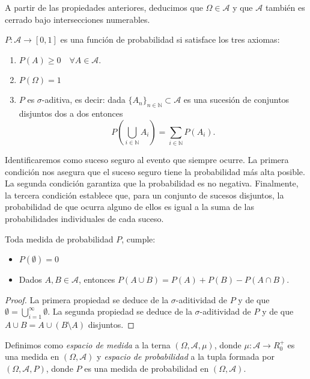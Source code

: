 \documentclass[oneside,openright,titlepage,numbers=noenddot,openany,headinclude,footinclude=true,
cleardoublepage=empty,abstractoff,BCOR=5mm,paper=a4,fontsize=12pt,main=spanish]{scrreprt}
\begin{document}
A partir de las propiedades anteriores, deducimos que $\Omega \in \mathcal{A}$ 
y que $\mathcal{A}$ también es cerrado bajo intersecciones numerables.

\begin{definition}
$P: \mathcal{A} \rightarrow [0,1]$ es una función de probabilidad si satisface los tres axiomas:
\begin{enumerate}
  \item $P(A) \geq 0 \quad \forall A \in \mathcal{A}$.
  \item $P(\Omega) = 1$
  \item $P$ es $\sigma$-aditiva, es decir: dada $\{A_n \}_{n \in \mathbb{N}} \subset \mathcal{A}$ es una sucesión de conjuntos disjuntos dos a dos entonces
    $$
    P\left( \bigcup_{i\in \mathbb{N}} A_i \right) = \sum_{i \in \mathbb{N}} P(A_i).
    $$
\end{enumerate}
\end{definition}

Identificaremos como suceso seguro al evento que siempre ocurre. La primera
condición nos asegura que el suceso seguro tiene la probabilidad más alta
posible. La segunda condición garantiza que la probabilidad es no negativa.
Finalmente, la tercera condición establece que, para un conjunto de sucesos
disjuntos, la probabilidad de que ocurra alguno de ellos es igual a la suma de
las probabilidades individuales de cada suceso.

\newpage

\begin{proposition}
Toda medida de probabilidad $P$, cumple:
  \begin{itemize}
    \item $P(\emptyset) = 0$
    \item Dados $A, B \in \mathcal{A}$, entonces $P(A \cup B) = P(A) + P(B) - P(A \cap B)$.
  \end{itemize}
\end{proposition}

\begin{proof}
  La primera propiedad se deduce de la $\sigma$-aditividad de $P$ y de que
  $\emptyset = \bigcup_{i=1}^\infty \emptyset$. La segunda propiedad se deduce
  de la $\sigma$-aditividad de $P$ y de que $A \cup B = A \cup (B \setminus A)$ disjuntos.

\end{proof}

\begin{definition}
Definimos como \textit{espacio de medida} a la terna $(\Omega, \mathcal{A}, \mu)$, donde $\mu: \mathcal{A} \rightarrow R_0^+$ 
es una medida en $(\Omega, \mathcal{A})$ y \textit{espacio de probabilidad} a la tupla formada por $(\Omega, \mathcal{A}, P)$, 
donde $P$ es una medida de probabilidad en $(\Omega, \mathcal{A})$.
\end{definition}
\end{document}

